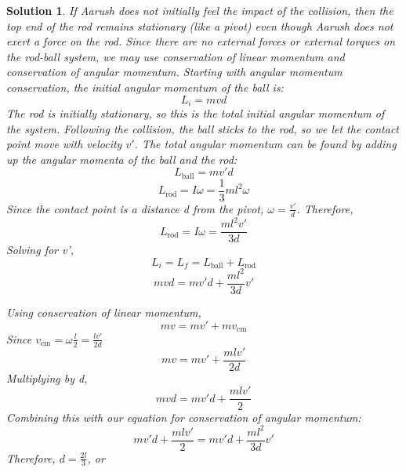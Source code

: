 \documentclass[12pt]{article}
\newtheorem*{solution}{Solution}
\theoremstyle{mystyle}
\begin{document}
\begin{solution}
    If Aarush does not initially feel the impact of the collision, then the top end of the rod remains stationary (like a pivot) even though Aarush does not exert a force on the rod. Since there are no external forces or external torques on the rod-ball system, we may use conservation of linear momentum and conservation of angular momentum. 
    Starting with angular momentum conservation, the initial angular momentum of the ball is:
    $$L_i = mvd$$
    The rod is initially stationary, so this is the total initial angular momentum of the system. Following the collision, the ball sticks to the rod, so we let the contact point move with velocity $v'$. The total angular momentum can be found by adding up the angular momenta of the ball and the rod:
    $$L_{\text{ball}} = mv'd$$
    $$L_{\text{rod}} = I\omega = \frac{1}{3}ml^2\omega$$
    Since the contact point is a distance d from the pivot, $\omega = \frac
    {v'}{d}$. Therefore,
    $$L_{\text{rod}} = I\omega = \frac{ml^2v'}{3d}$$
    Solving for v', 
    $$L_i = L_f = L_{\text{ball}} + L_{\text{rod}}$$
    $$mvd = mv'd + \frac{ml^2}{3d}v'$$

    Using conservation of linear momentum, 
    $$mv = mv' + mv_{\text{cm}}$$
    Since $v_{\text{cm}} = \omega \frac{l}{2} = \frac{lv'}{2d}$
    $$mv = mv' + \frac{mlv'}{2d}$$
    Multiplying by d, 
    $$mvd = mv'd + \frac{mlv'}{2}$$
    Combining this with our equation for conservation of angular momentum:
    $$mv'd + \frac{mlv'}{2} = mv'd + \frac{ml^2}{3d}v'$$
    Therefore, $d = \frac{2l}{3}$, or 
\end{solution}
\end{document}
